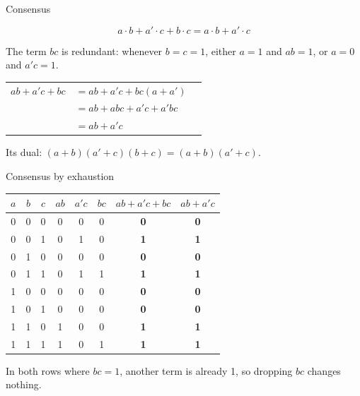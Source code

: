 \documentclass[10pt]{wosm-slides}
\makeatletter
\newenvironment{derivation}
  {\begin{tabular}{@{}r@{\;}l@{\qquad}l@{}}}
  {\end{tabular}}
\newcommand*\by[1]{\wosmlabel{#1}}
\makeatother
\begin{document}
\begin{frame}{Consensus}
  \begin{theorem}[Consensus]
    \[ a \cdot b + a' \cdot c + b \cdot c = a \cdot b + a' \cdot c \]
  \end{theorem}

  The term $bc$ is redundant: whenever $b = c = 1$, either $a = 1$ and $ab = 1$, or
  $a = 0$ and $a'c = 1$.

  \medskip
  \small
  \begin{derivation}
    $ab + a'c + bc$ & $= ab + a'c + bc(a + a')$ & \by{identity, complement} \\
                    & $= ab + abc + a'c + a'bc$ & \by{distributivity, commutativity} \\
                    & $= ab + a'c$ & \by{absorption, twice} \\
  \end{derivation}

  \medskip
  \normalsize
  Its dual: $(a + b)(a' + c)(b + c) = (a + b)(a' + c)$.
\end{frame}

\begin{frame}{Consensus by exhaustion}
  \begin{center}
    \small
    \begin{tabular}{@{}ccc|ccc|c|c@{}}
      $a$ & $b$ & $c$ & $ab$ & $a'c$ & $bc$ & $ab + a'c + bc$ & $ab + a'c$ \\
      \midrule
      0 & 0 & 0 & 0 & 0 & 0 & \textbf{0} & \textbf{0} \\
      0 & 0 & 1 & 0 & 1 & 0 & \textbf{1} & \textbf{1} \\
      0 & 1 & 0 & 0 & 0 & 0 & \textbf{0} & \textbf{0} \\
      0 & 1 & 1 & 0 & 1 & \alert{1} & \textbf{1} & \textbf{1} \\
      1 & 0 & 0 & 0 & 0 & 0 & \textbf{0} & \textbf{0} \\
      1 & 0 & 1 & 0 & 0 & 0 & \textbf{0} & \textbf{0} \\
      1 & 1 & 0 & 1 & 0 & 0 & \textbf{1} & \textbf{1} \\
      1 & 1 & 1 & 1 & 0 & \alert{1} & \textbf{1} & \textbf{1} \\
    \end{tabular}
  \end{center}

  \medskip
  In both rows where $bc = 1$, another term is already 1, so dropping $bc$ changes
  nothing.
\end{frame}
\end{document}
